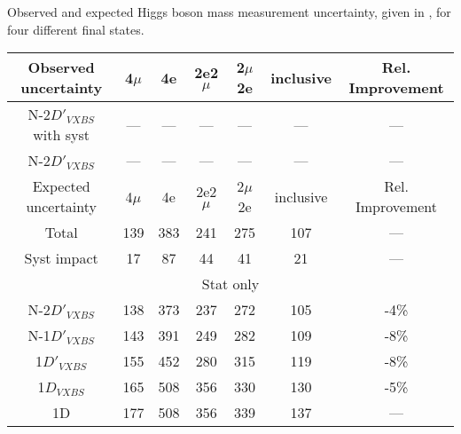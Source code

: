 \begin{table}[ht]	
\begin{center}
    \topcaption
    {Observed and expected Higgs boson mass measurement uncertainty, 
    given in \MeVns, for four different final states.}
    \begin{tabular}{ccccccc}
    \hline			
    Observed uncertainty	&	4$\mu$	&	4e	&	2e2$\mu$	&2$\mu$2e	& inclusive & Rel. Improvement \\
    \hline			
    N-2$D'_{VXBS}$ with syst	&	---	&	---	&	---	&	---	&	---	&	---	\\
    N-2$D'_{VXBS}$	&	---	&	---	&	---	&	---	&	---	&	---	\\
    \hline			
    \hline			
    Expected uncertainty	&	4$\mu$	&	4e	&	2e2$\mu$	&2$\mu$2e	& inclusive & Rel. Improvement \\
    \hline			
    Total	&	139	&	383	&	241	&	275	&	107	&	---	\\
    \hline
    Syst impact	&	17	&	87	&	44	&	41	&	21	&	---	\\
    \hline
    \multicolumn{7}{c}{Stat only}\\
    \hline
        N-2$D'_{VXBS}$	&	138	&	373	&	237	&	272	&	105	&	-4\%	\\
        N-1$D'_{VXBS}$	&	143	&	391	&	249	&	282	&	109	&	-8\%	\\
        1$D'_{VXBS}$	&	155	&	452	&	280	&	315	&	119	&	-8\%	\\
        1$D_{VXBS}$	&	165	&	508	&	356	&	330	&	130	&	-5\%	\\
        1D	&	177	&	508	&	356	&	339	&	137	&	---	\\
    \hline			
    \end{tabular}
    \label{table:2D_refit_result_finals}
\end{center}
\end{table}

